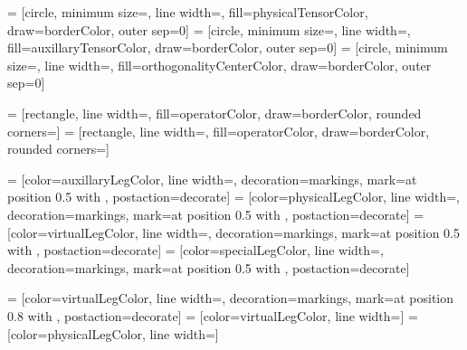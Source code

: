  = [circle, minimum size=\smallTensorWidth, line width=, fill=physicalTensorColor, draw=borderColor, outer sep=0]
 = [circle, minimum size=\smallTensorWidth, line width=, fill=auxillaryTensorColor, draw=borderColor, outer sep=0]
 = [circle, minimum size=\smallTensorWidth, line width=, fill=orthogonalityCenterColor, draw=borderColor, outer sep=0]

 = [rectangle, line width=, fill=operatorColor, draw=borderColor, rounded corners=\roundedCornerInsetNormal]
 = [rectangle, line width=, fill=operatorColor, draw=borderColor, rounded corners=\roundedCornerInsetSmall]

 = [color=auxillaryLegColor, line width=, decoration={markings, mark=at position 0.5 with {}}, postaction={decorate}]
 = [color=physicalLegColor, line width=, decoration={markings, mark=at position 0.5 with {}}, postaction={decorate}]
 = [color=virtualLegColor, line width=, decoration={markings, mark=at position 0.5 with {}}, postaction={decorate}]
 = [color=specialLegColor, line width=, decoration={markings, mark=at position 0.5 with {}}, postaction={decorate}]

 = [color=virtualLegColor, line width=, decoration={markings, mark=at position 0.8 with {}}, postaction={decorate}]
 = [color=virtualLegColor, line width=]
 = [color=physicalLegColor, line width=]


